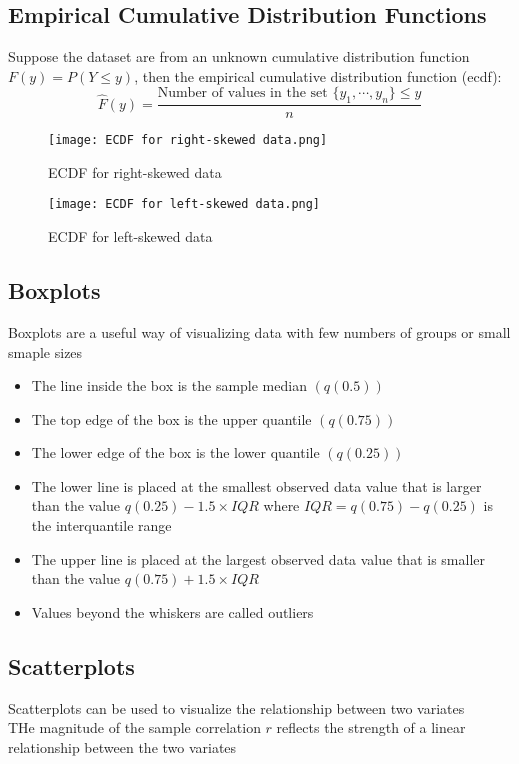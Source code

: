 \documentclass[11pt]{article}
\begin{document}
\subsection{Empirical Cumulative Distribution Functions}
Suppose the dataset are from an unknown cumulative distribution function $F(y)=P(Y\leq y)$, then the empirical cumulative distribution function (ecdf):
\[\hat{F}(y) = \frac{\text{Number of values in the set }\{y_1,\cdots,y_n\}\leq y}{n}\]
\begin{figure}[tbhp]
	\begin{center}
		\texttt{[image: ECDF for right-skewed data.png]}
	\end{center}
	\caption{ECDF for right-skewed data}
	\label{figcaption}
\end{figure}
\begin{figure}[tbhp]
	\begin{center}
		\texttt{[image: ECDF for left-skewed data.png]}
	\end{center}
	\caption{ECDF for left-skewed data}
	\label{figcaption}
\end{figure}
\subsection{Boxplots}
Boxplots are a useful way of visualizing data with few numbers of groups or small smaple sizes
\begin{itemize}
  \item The line inside the box is the sample median $(q(0.5))$
  \item The top edge of the box is the upper quantile $(q(0.75))$
  \item The lower edge of the box is the lower quantile $(q(0.25))$
  \item The lower line is placed at the smallest observed data value that is larger than the value $q(0.25)-1.5\times IQR$ where $IQR = q(0.75) - q(0.25)$ is the interquantile range 
  \item The upper line is placed at the largest observed data value that is smaller than the value $q(0.75)+1.5\times IQR$
  \item Values beyond the whiskers are called outliers
\end{itemize}
\subsection{Scatterplots}
Scatterplots can be used to visualize the relationship between two variates \\
THe magnitude of the sample correlation $r$ reflects the strength of a linear relationship between the two variates 
\end{document}
